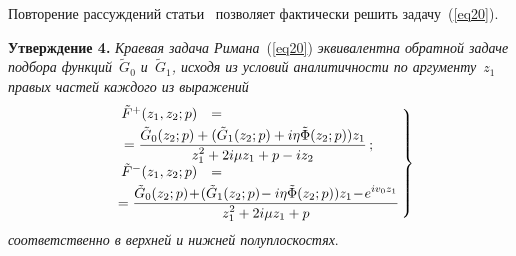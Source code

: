 \begin{multicols}{2}
Повторение рассуждений статьи~\cite{ref14} позволяет фактически решить задачу~(\ref{eq20}).

\smallskip

\noindent
\textbf{Утверждение 4.}
  \textit{Краевая задача Римана}~(\ref{eq20}) \textit{эквивалентна обратной задаче подбора функций~$\tilde G_0$ и~$\tilde G_1$, исходя из условий аналитичности по аргументу~$z_1$ правых частей каждого из выражений}
  \begin{equation}
  \left.
  \begin{array}{rl}
     \tilde F^+(z_1, z_2; p) &={}\\[3pt]
      {}&\hspace*{-22mm}=\displaystyle\fr{\tilde G_0(z_2; p) + (\tilde G_1(z_2; p) + i \eta \tilde \Phi(z_2; p))z_1}{z_1^2 +2i \mu   z_1 + p - i z_2}\,;\\[7pt]
     \tilde F^-(z_1, z_2; p) &= {}\\[3pt]
&\hspace*{-24.5mm}{}=\displaystyle\fr{\tilde G_0(z_2; p) \!+\! (\tilde G_1(z_2; p) \!- i \eta \tilde \Phi(z_2; p))z_1 \!-\! e^{i v_0 z_1}}{z_1^2 +2i \mu   z_1 + p}\!    \end{array}\!
    \right\}\!\!\!
        \label{eq21}
  \end{equation}
 \textit{соответственно в верхней и нижней полуплоскостях}.


\smallskip


\end{multicols}
